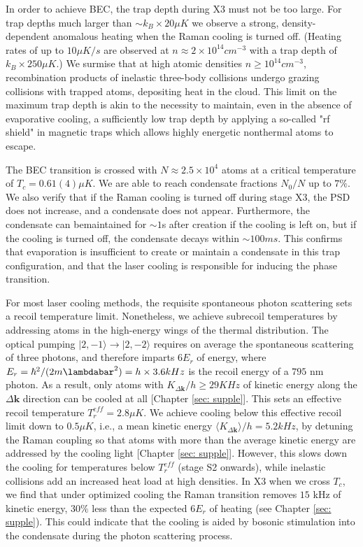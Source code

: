\documentclass{article}
\begin{document}
In order to achieve BEC, the trap depth during X3 must not be too large. For trap depths much larger than $\sim k_B \times 20 \mu K$ we observe a strong, density-dependent anomalous heating when the Raman cooling is turned off. (Heating rates of up to $10 \mu K/s$ are observed at $n \approx 2 \times 10^{14} cm^{-3}$ with a trap depth of $k_B \times 250 \mu K$.) We surmise that at high atomic densities $n \geq 10^{14} cm^{-3}$, recombination products of inelastic three-body collisions undergo grazing collisions with trapped atoms, depositing heat in the cloud. This limit on the maximum trap depth is akin to the necessity to maintain, even in the absence of evaporative cooling, a sufficiently low trap depth by applying a so-called "rf shield" in magnetic traps which allows highly energetic nonthermal atoms to escape.

The BEC transition is crossed with $N \approx 2.5 \times 10^4$ atoms at a critical temperature of $T_c = 0.61(4) \mu K$. We are able to reach condensate fractions $N_0/N$ up to $7\%$. We also verify that if the Raman cooling is turned off during stage X3, the PSD does not increase, and a condensate does not appear. Furthermore, the condensate can bemaintained for $\sim 1$s after creation if the cooling is left on, but if the cooling is turned off, the condensate decays within $\sim 100 ms$. This confirms that evaporation is insufficient to create or maintain a condensate in this trap configuration, and that the laser cooling is responsible for inducing the phase transition.

For most laser cooling methods, the requisite spontaneous photon scattering sets a recoil temperature limit. Nonetheless, we achieve subrecoil temperatures by addressing atoms in the high-energy wings of the thermal distribution. The optical pumping $\vert 2, -1 \rangle \rightarrow \vert 2, -2 \rangle$ requires on average the spontaneous scattering of three photons, and therefore imparts $6E_r$ of energy, where $E_r = \hbar^2 / (2m \lambdabar^2) = h \times 3.6 kHz$ is the recoil energy of a $795$ nm photon. As a result, only atoms with $K_{\Delta \mathbf{k}}/h \geq 29 KHz$ of kinetic energy along the $\Delta \mathbf{k}$ direction can be cooled at all [Chapter \ref{sec: supple}]. This sets an effective recoil temperature $T^{eff}_r = 2.8 \mu K$. We achieve cooling below this effective recoil limit down to $0.5 \mu K$, i.e., a mean kinetic energy $\langle K_{\Delta \mathbf{k}}\rangle / h = 5.2 kHz$, by detuning the Raman coupling so that atoms with more than the average kinetic energy are addressed by the cooling light [Chapter \ref{sec: supple}]. However, this slows down the cooling for temperatures below $T^{eff}_r$ (stage S2 onwards), while inelastic collisions add an increased heat load at high densities. In X3 when we cross $T_c$, we find that under optimized cooling the Raman transition removes $15$ kHz of kinetic energy, $30\%$ less than the expected $6E_r$ of heating (see Chapter \ref{sec: supple}). This could indicate that the cooling is aided by bosonic stimulation into the condensate during the photon scattering process.
\end{document}
